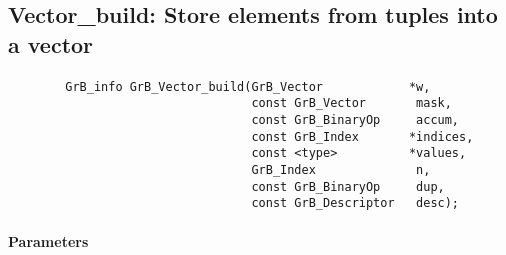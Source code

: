 \subsection{{\sf Vector\_build}: Store elements from tuples into a vector}
\label{Sec:Vector_build}

\paragraph{\syntax}

\begin{verbatim}
        GrB_info GrB_Vector_build(GrB_Vector            *w,
                                  const GrB_Vector       mask,
                                  const GrB_BinaryOp     accum,
                                  const GrB_Index       *indices,
                                  const <type>          *values,
                                  GrB_Index              n,
                                  const GrB_BinaryOp     dup,
                                  const GrB_Descriptor   desc);
\end{verbatim}

\paragraph{Parameters}

